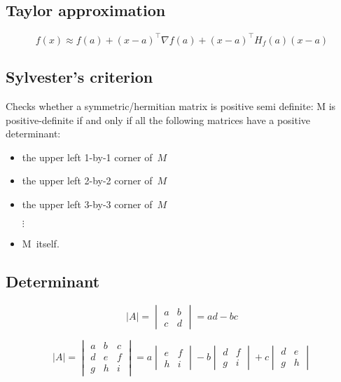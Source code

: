 \subsection{Taylor approximation}

$$
f(x)\approx f(a)+(x-a)^\intercal\nabla f(a) + (x-a)^\intercal H_f(a)(x-a)
$$

\subsection{Sylvester's criterion}

Checks whether a symmetric/hermitian matrix is positive semi definite: M is positive-definite if and only if all the following matrices have a positive determinant:

\begin{itemize}
	\item the upper left 1-by-1 corner of $M$
	\item the upper left 2-by-2 corner of $M$
	\item the upper left 3-by-3 corner of $M$

    $\vdots$

	\item M itself.
\end{itemize}

\subsection{Determinant}

$$
|A|=\begin{vmatrix}
	a & b\\
	c & d
\end{vmatrix} = ad - bc
$$

$$
|A|=\begin{vmatrix}
	a & b & c\\
	d & e & f\\
	g & h & i
\end{vmatrix} = a
\begin{vmatrix}
	e & f\\
	h & i
\end{vmatrix}
-b
\begin{vmatrix}
	d & f\\
	g & i
\end{vmatrix}
+c
\begin{vmatrix}
	d & e\\
	g & h
\end{vmatrix}
$$

